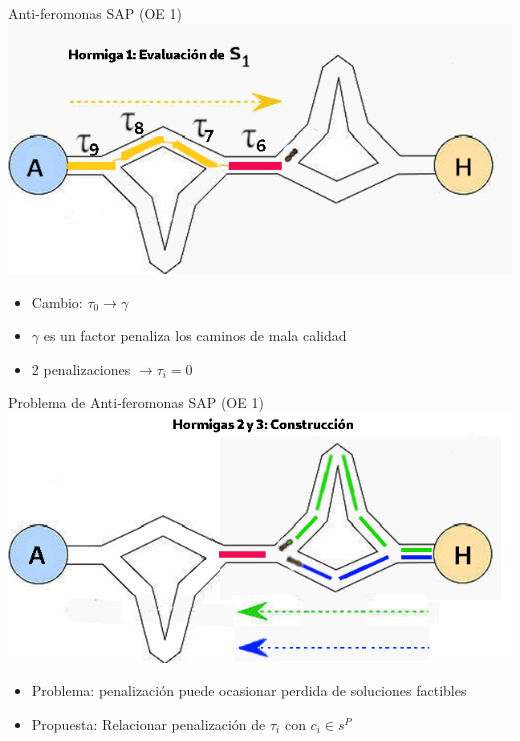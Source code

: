\begin{frame}{Anti-feromonas SAP (OE 1)}
\centering
\includegraphics[scale=0.4]{Pictures/ACO-ant-ferom-penalize.png}
    \begin{itemize}
        \item Cambio: $\tau_0 \longrightarrow \gamma$
        \item $\gamma$ es un factor penaliza los caminos de mala calidad
        \item 2 penalizaciones $\longrightarrow \tau_i = 0$ 
    \end{itemize}
\end{frame}

\begin{frame}{Problema de Anti-feromonas SAP (OE 1)}
\centering
\includegraphics[scale=0.4]{Pictures/ACO-ant-constr-penalize.png}
    \begin{itemize}
        \item Problema: penalizaci\'on puede ocasionar perdida de soluciones factibles
        \item Propuesta: Relacionar penalizaci\'on de $\tau_i$ con $c_i \in s^P$
    \end{itemize}
\end{frame}

